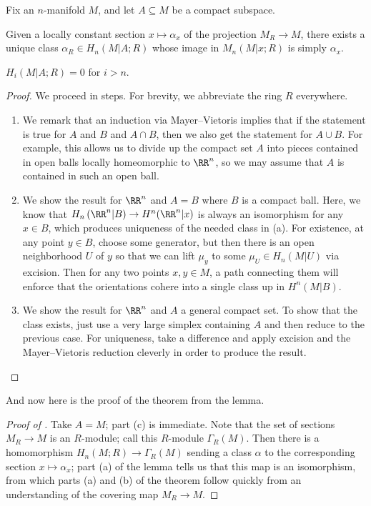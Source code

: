 \documentclass[../notes.tex]{subfiles}
\begin{document}
\begin{lemma} \label{lem:general-orientable-via-homology}
	Fix an $n$-manifold $M$, and let $A\subseteq M$ be a compact subspace.
	\begin{listalph}
		\item Given a locally constant section $x\mapsto\alpha_x$ of the projection $M_R\to M$, there exists a unique class $\alpha_R\in H_n(M|A;R)$ whose image in $M_n(M|x;R)$ is simply $\alpha_x$.
		\item $H_i(M|A;R)=0$ for $i>n$.
	\end{listalph}
\end{lemma}
\begin{proof}
	We proceed in steps. For brevity, we abbreviate the ring $R$ everywhere.
	\begin{enumerate}
		\item We remark that an induction via Mayer--Vietoris implies that if the statement is true for $A$ and $B$ and $A\cap B$, then we also get the statement for $A\cup B$. For example, this allows us to divide up the compact set $A$ into pieces contained in open balls locally homeomorphic to $\RR^n$, so we may assume that $A$ is contained in such an open ball.
		\item We show the result for $\RR^n$ and $A=B$ where $B$ is a compact ball. Here, we know that $H_n\left(\RR^n|B\right)\to H^n(\RR^n|x)$ is always an isomorphism for any $x\in B$, which produces uniqueness of the needed class in (a). For existence, at any point $y\in B$, choose some generator, but then there is an open neighborhood $U$ of $y$ so that we can lift $\mu_y$ to some $\mu_U\in H_n(M|U)$ via excision. Then for any two points $x,y\in M$, a path connecting them will enforce that the orientations cohere into a single class up in $H^n(M|B)$.
		\item We show the result for $\RR^n$ and $A$ a general compact set. To show that the class exists, just use a very large simplex containing $A$ and then reduce to the previous case. For uniqueness, take a difference and apply excision and the Mayer--Vietoris reduction cleverly in order to produce the result.
		\qedhere
	\end{enumerate}
\end{proof}
And now here is the proof of the theorem from the lemma.
\begin{proof}[Proof of ]
	Take $A=M$; part (c) is immediate. Note that the set of sections $M_R\to M$ is an $R$-module; call this $R$-module $\Gamma_R(M)$. Then there is a homomorphism $H_n(M;R)\to\Gamma_R(M)$ sending a class $\alpha$ to the corresponding section $x\mapsto\alpha_x$; part (a) of the lemma tells us that this map is an isomorphism, from which parts (a) and (b) of the theorem follow quickly from an understanding of the covering map $M_R\to M$.
\end{proof}
\end{document}
